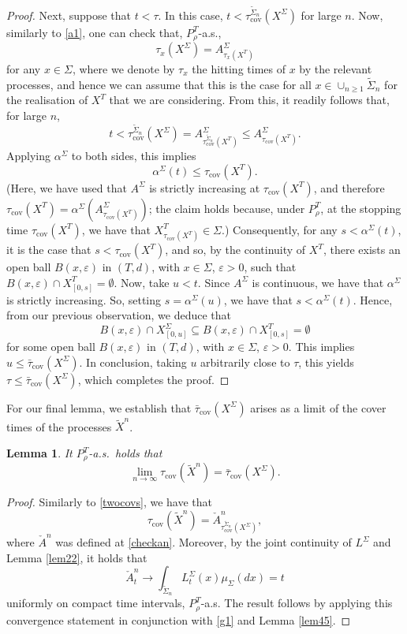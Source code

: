 \documentclass[a4paper, 11pt]{article}
\newtheorem{lem}[theorem]{Lemma}
\begin{document}
\begin{proof}
Next, suppose that $t<\tau$. In this case, $t<\tau_{\mathrm{cov}}^{\tilde{\Sigma}_n}(X^\Sigma)$ for large $n$. Now, similarly to \eqref{a1}, one can check that, $P_\rho^T$-a.s.,
\[\tau_x(X^\Sigma)=A^\Sigma_{\tau_x(X^T)}\]
for any $x\in\Sigma$, where we denote by $\tau_x$ the hitting times of $x$ by the relevant processes, and hence we can assume that this is the case for all $x\in \cup_{n\geq 1}\tilde{\Sigma}_n$ for the realisation of $X^T$ that we are considering. From this, it readily follows that, for large $n$,
\[t<\tau_{\mathrm{cov}}^{\tilde{\Sigma}_n}(X^\Sigma)=A^\Sigma_{\tau_{\mathrm{cov}}^{\tilde{\Sigma}_n}(X^T)}\leq A^\Sigma_{\tau_{\mathrm{cov}}(X^T)}.\]
Applying $\alpha^\Sigma$ to both sides, this implies
\[\alpha^\Sigma(t)\leq \tau_{\mathrm{cov}}(X^T).\]
(Here, we have used that $A^\Sigma$ is strictly increasing at $\tau_{\mathrm{cov}}(X^T)$, and therefore $\tau_{\mathrm{cov}}(X^T)=\alpha^\Sigma(A^\Sigma_{\tau_{\mathrm{cov}}(X^T)})$; the claim holds because, under $P_\rho^T$, at the stopping time $\tau_{\mathrm{cov}}(X^T)$, we have that $X^T_{\tau_{\mathrm{cov}}(X^T)}\in\Sigma$.) Consequently, for any $s<\alpha^\Sigma(t)$, it is the case that $s<\tau_{\mathrm{cov}}(X^T)$, and so, by the continuity of $X^T$, there exists an open ball $B(x,\varepsilon)$ in $(T,d)$, with $x\in\Sigma$, $\varepsilon>0$, such that $B(x,\varepsilon)\cap {X}^T_{[0,s]}=\emptyset$. Now, take $u<t$. Since $A^\Sigma$ is continuous, we have that $\alpha^\Sigma$ is strictly increasing. So, setting $s=\alpha^\Sigma(u)$, we have that $s<\alpha^\Sigma(t)$. Hence, from our previous observation, we deduce that
\[B(x,\varepsilon)\cap {X}^\Sigma_{[0,u]}\subseteq B(x,\varepsilon)\cap {X}^T_{[0,s]}=\emptyset\]
for some open ball $B(x,\varepsilon)$ in $(T,d)$, with $x\in\Sigma$, $\varepsilon>0$. This implies $u\leq \bar\tau_{\mathrm{cov}}({X}^\Sigma)$. In conclusion, taking $u$ arbitrarily close to $\tau$, this yields $\tau\leq \bar\tau_{\mathrm{cov}}({X}^\Sigma)$, which completes the proof.
\end{proof}

For our final lemma, we establish that $\bar\tau_{\mathrm{cov}}({X}^\Sigma)$ arises as a limit of the cover times of the processes $\tilde{X}^n$.

\begin{lem}\label{lem46} It $P_\rho^T$-a.s.\ holds that
\[\lim_{n\rightarrow\infty}\tau_{\mathrm{cov}}(\tilde{X}^n)=\bar\tau_{\mathrm{cov}}({X}^\Sigma).\]
\end{lem}
\begin{proof} Similarly to \eqref{twocovs}, we have that
\begin{equation}\label{g1}
\tau_{\mathrm{cov}}(\tilde{X}^n)=\check A^n_{\tau_{\mathrm{cov}}^{\tilde{\Sigma}_n}(X^\Sigma)},
\end{equation}
where $\check{A}^n$ was defined at \eqref{checkan}. Moreover, by the joint continuity of $L^\Sigma$ and Lemma \ref{lem22}, it holds that
\[\check A^n_t\rightarrow \int_{\tilde{\Sigma}_n}L^\Sigma_t(x)\mu_\Sigma(dx)=t\]
uniformly on compact time intervals, $P_\rho^T$-a.s. The result follows by applying this convergence statement in conjunction with \eqref{g1} and Lemma \ref{lem45}.
\end{proof}
\end{document}

